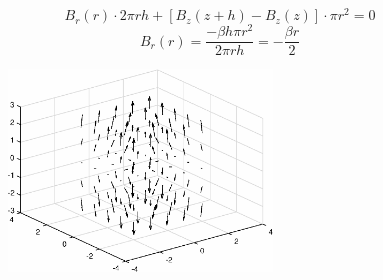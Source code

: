 \documentclass{article}
\begin{document}
\section{}
$$B_r(r)\cdot2\pi rh+[B_z(z+h)-B_z(z)]\cdot\pi r^2=0$$
$$B_r(r)=\frac{-\beta h\pi r^2}{2\pi rh}=-\frac{\beta r}{2}$$
\begin{figure}[h!]
    \centering
    \includegraphics[width=7cm]{7.eps}
    \label{fig-7}
\end{figure}
\end{document}
